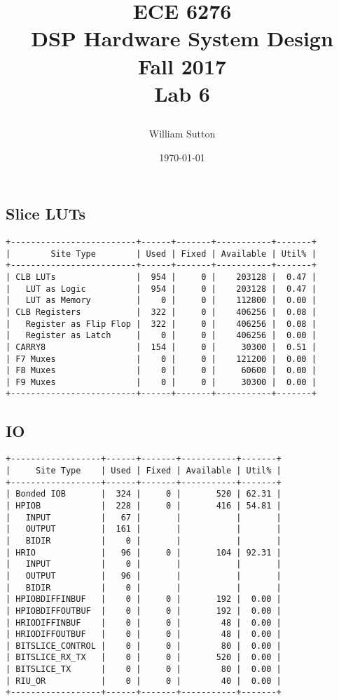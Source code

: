 \documentclass[11pt]{report}
\title{
		\Huge{
				\textbf{ECE 6276
						\\DSP Hardware System Design
						\\Fall 2017}}
			\\[2cm]
		\LARGE{
			\textnormal{Lab 6}}
			\\[1cm]
			\date{\today}
		\large{
			\author{William Sutton}
		}}
\begin{document}
\lstset{language=MATLAB}
\maketitle
	

		
\newpage		
\subsection*{Slice LUTs}
\small
\begin{lstlisting}
+-------------------------+------+-------+-----------+-------+
|        Site Type        | Used | Fixed | Available | Util% |
+-------------------------+------+-------+-----------+-------+
| CLB LUTs                |  954 |     0 |    203128 |  0.47 |
|   LUT as Logic          |  954 |     0 |    203128 |  0.47 |
|   LUT as Memory         |    0 |     0 |    112800 |  0.00 |
| CLB Registers           |  322 |     0 |    406256 |  0.08 |
|   Register as Flip Flop |  322 |     0 |    406256 |  0.08 |
|   Register as Latch     |    0 |     0 |    406256 |  0.00 |
| CARRY8                  |  154 |     0 |     30300 |  0.51 |
| F7 Muxes                |    0 |     0 |    121200 |  0.00 |
| F8 Muxes                |    0 |     0 |     60600 |  0.00 |
| F9 Muxes                |    0 |     0 |     30300 |  0.00 |
+-------------------------+------+-------+-----------+-------+
\end{lstlisting}


\newpage
\subsection*{IO}
\small
\begin{lstlisting}
+------------------+------+-------+-----------+-------+
|     Site Type    | Used | Fixed | Available | Util% |
+------------------+------+-------+-----------+-------+
| Bonded IOB       |  324 |     0 |       520 | 62.31 |
| HPIOB            |  228 |     0 |       416 | 54.81 |
|   INPUT          |   67 |       |           |       |
|   OUTPUT         |  161 |       |           |       |
|   BIDIR          |    0 |       |           |       |
| HRIO             |   96 |     0 |       104 | 92.31 |
|   INPUT          |    0 |       |           |       |
|   OUTPUT         |   96 |       |           |       |
|   BIDIR          |    0 |       |           |       |
| HPIOBDIFFINBUF   |    0 |     0 |       192 |  0.00 |
| HPIOBDIFFOUTBUF  |    0 |     0 |       192 |  0.00 |
| HRIODIFFINBUF    |    0 |     0 |        48 |  0.00 |
| HRIODIFFOUTBUF   |    0 |     0 |        48 |  0.00 |
| BITSLICE_CONTROL |    0 |     0 |        80 |  0.00 |
| BITSLICE_RX_TX   |    0 |     0 |       520 |  0.00 |
| BITSLICE_TX      |    0 |     0 |        80 |  0.00 |
| RIU_OR           |    0 |     0 |        40 |  0.00 |
+------------------+------+-------+-----------+-------+
\end{lstlisting}
\end{document}
